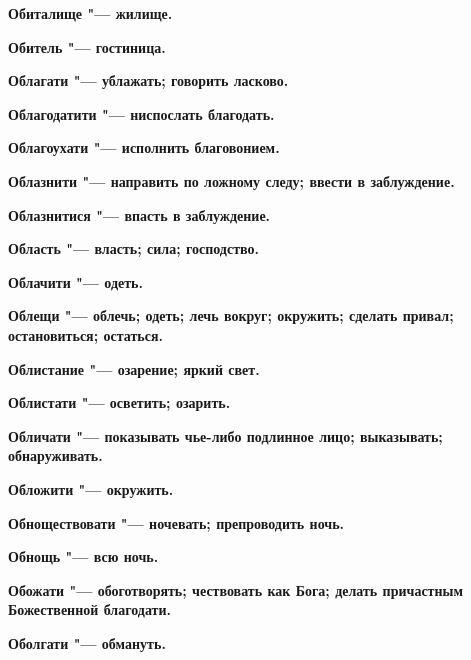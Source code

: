 \begin{mymulticols}{2}
\bfseries Обиталище\normalfont{} "--- жилище. 




\bfseries Обитель\normalfont{} "--- гостиница. 




\bfseries Облагати\normalfont{} "--- ублажать; говорить ласково. 




\bfseries Облагодатити\normalfont{} "--- ниспослать благодать. 




\bfseries Облагоухати\normalfont{} "--- исполнить благовонием. 




\bfseries Облазнити\normalfont{} "--- направить по ложному следу; ввести в заблуждение. 




\bfseries Облазнитися\normalfont{} "--- впасть в заблуждение. 




\bfseries Область\normalfont{} "--- власть; сила; господство. 




\bfseries Облачити\normalfont{} "--- одеть. 




\bfseries Облещи\normalfont{} "--- облечь; одеть; лечь вокруг; окружить; сделать привал; остановиться; остаться. 




\bfseries Облистание\normalfont{} "--- озарение; яркий свет. 




\bfseries Облистати\normalfont{} "--- осветить; озарить. 




\bfseries Обличати\normalfont{} "--- показывать чье-либо подлинное лицо; выказывать; обнаруживать. 




\bfseries Обложити\normalfont{} "--- окружить. 




\bfseries Обноществовати\normalfont{} "--- ночевать; препроводить ночь. 




\bfseries Обнощь\normalfont{} "--- всю ночь. 




\bfseries Обожати\normalfont{} "--- обоготворять; чествовать как Бога; делать причастным Божественной благодати. 




\bfseries Оболгати\normalfont{} "--- обмануть. 





\end{mymulticols}
